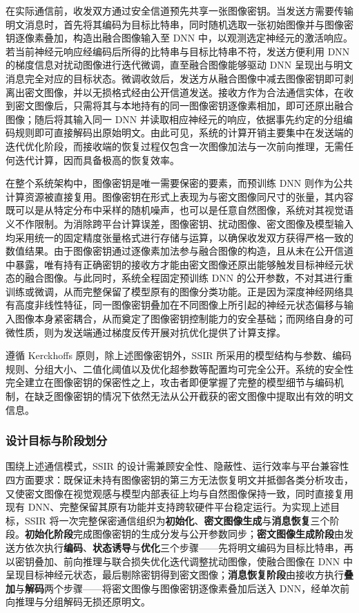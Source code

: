 在实际通信前，收发双方通过安全信道预先共享一张图像密钥。当发送方需要传输明文消息时，首先将其编码为目标比特串，同时随机选取一张初始图像并与图像密钥逐像素叠加，构造出融合图像输入至 DNN 中，以观测选定神经元的激活响应。若当前神经元响应经编码后所得的比特串与目标比特串不符，发送方便利用 DNN 的梯度信息对扰动图像进行迭代微调，直至融合图像能够驱动 DNN 呈现出与明文消息完全对应的目标状态。微调收敛后，发送方从融合图像中减去图像密钥即可剥离出密文图像，并以无损格式经由公开信道发送。接收方作为合法通信实体，在收到密文图像后，只需将其与本地持有的同一图像密钥逐像素相加，即可还原出融合图像；随后将其输入同一 DNN 并读取相应神经元的响应，依据事先约定的分组编码规则即可直接解码出原始明文。由此可见，系统的计算开销主要集中在发送端的迭代优化阶段，而接收端的恢复过程仅包含一次图像加法与一次前向推理，无需任何迭代计算，因而具备极高的恢复效率。

在整个系统架构中，图像密钥是唯一需要保密的要素，而预训练 DNN 则作为公共计算资源被直接复用。图像密钥在形式上表现为与密文图像同尺寸的张量，其内容既可以是从特定分布中采样的随机噪声，也可以是任意自然图像，系统对其视觉语义不作限制。为消除跨平台计算误差，图像密钥、扰动图像、密文图像及模型输入均采用统一的固定精度张量格式进行存储与运算，以确保收发双方获得严格一致的数值结果。由于图像密钥通过逐像素加法参与融合图像的构造，且从未在公开信道中暴露，唯有持有正确密钥的接收方才能由密文图像还原出能够触发目标神经元状态的融合图像。与此同时，系统全程固定预训练 DNN 的公开参数，不对其进行重训练或微调，从而完整保留了模型原有的图像分类功能。正是因为深度神经网络具有高度非线性特征，同一图像密钥叠加在不同图像上所引起的神经元状态偏移与输入图像本身紧密耦合，从而奠定了图像密钥控制能力的安全基础；而网络自身的可微性质，则为发送端通过梯度反传开展对抗优化提供了计算支撑。

遵循 Kerckhoffs 原则，除上述图像密钥外，SSIR 所采用的模型结构与参数、编码规则、分组大小、二值化阈值以及优化超参数等配置均可完全公开。系统的安全性完全建立在图像密钥的保密性之上，攻击者即便掌握了完整的模型细节与编码机制，在缺乏图像密钥的情况下依然无法从公开截获的密文图像中提取出有效的明文信息。

\subsubsection{设计目标与阶段划分}
围绕上述通信模式，SSIR 的设计需兼顾安全性、隐蔽性、运行效率与平台兼容性四方面要求：既保证未持有图像密钥的第三方无法恢复明文并抵御各类分析攻击，又使密文图像在视觉观感与模型内部表征上均与自然图像保持一致，同时直接复用现有 DNN、完整保留其原有功能并支持跨软硬件平台稳定运行。为实现上述目标，SSIR 将一次完整保密通信组织为\textbf{初始化}、\textbf{密文图像生成}与\textbf{消息恢复}三个阶段。\textbf{初始化阶段}完成图像密钥的生成分发与公开参数同步；\textbf{密文图像生成阶段}由发送方依次执行\textbf{编码}、\textbf{状态诱导}与\textbf{优化}三个步骤——先将明文编码为目标比特串，再以密钥叠加、前向推理与联合损失优化迭代调整扰动图像，使融合图像在 DNN 中呈现目标神经元状态，最后剔除密钥得到密文图像；\textbf{消息恢复阶段}由接收方执行\textbf{叠加}与\textbf{解码}两个步骤——将密文图像与图像密钥逐像素叠加后送入 DNN，经单次前向推理与分组解码无损还原明文。

